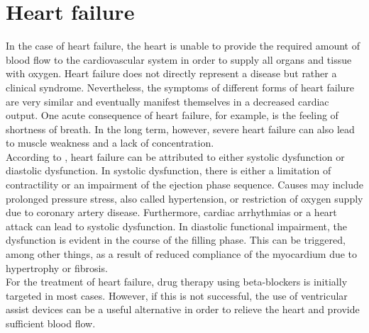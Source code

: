 \section{Heart failure}
In the case of heart failure, the heart is unable to provide the required amount of blood flow to the cardiovascular system in order to supply all organs and tissue with oxygen.
Heart failure does not directly represent a disease but rather a clinical syndrome. Nevertheless, the symptoms of different forms of heart failure are very similar and eventually manifest themselves in a decreased cardiac output. One acute consequence of heart failure, for example, is the feeling of shortness of breath. In the long term, however, severe heart failure can also lead to muscle weakness and a lack of concentration.
\\According to \cite{HKS4}, heart failure can be attributed to either systolic dysfunction or diastolic dysfunction. In systolic dysfunction, there is either a limitation of contractility or an impairment of the ejection phase sequence. Causes may include prolonged pressure stress, also called hypertension, or restriction of oxygen supply due to coronary artery disease. Furthermore, cardiac arrhythmias or a heart attack can lead to systolic dysfunction. In diastolic functional impairment, the dysfunction is evident in the course of the filling phase. This can be triggered, among other things, as a result of reduced compliance of the myocardium due to hypertrophy or fibrosis.
\\For the treatment of heart failure, drug therapy using beta-blockers is initially targeted in most cases. However, if this is not successful, the use of ventricular assist devices can be a useful alternative in order to relieve the heart and provide sufficient blood flow. \cite{HKS4}

